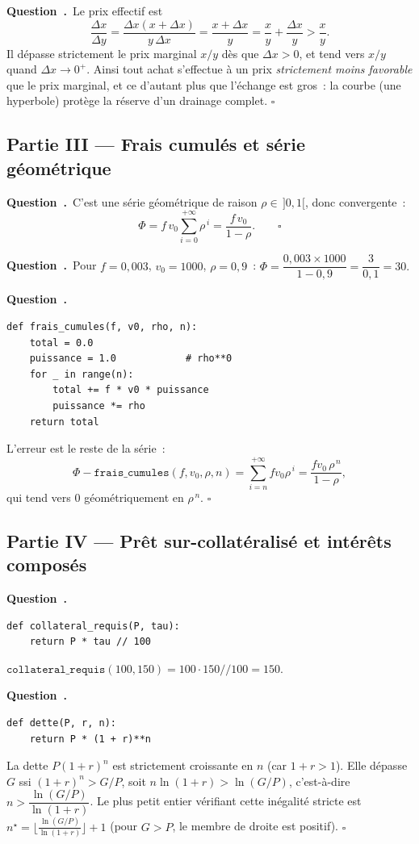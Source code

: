 \documentclass[11pt,a4paper]{article}
\newcounter{qcnt}
\newcommand{\Q}{\medskip\par\stepcounter{qcnt}\noindent\textbf{Question~\theqcnt.}~}
\begin{document}
\Q Le prix effectif est
$$\frac{\Delta x}{\Delta y} = \frac{\Delta x (x+\Delta x)}{y\,\Delta x}
= \frac{x+\Delta x}{y} = \frac{x}{y} + \frac{\Delta x}{y} > \frac{x}{y}.$$
Il dépasse strictement le prix marginal $x/y$ dès que $\Delta x > 0$, et tend vers $x/y$ quand
$\Delta x \to 0^{+}$. Ainsi tout achat s'effectue à un prix \emph{strictement moins favorable}
que le prix marginal, et ce d'autant plus que l'échange est gros~: la courbe (une hyperbole)
protège la réserve d'un drainage complet. $\square$

\subsection*{Partie III --- Frais cumulés et série géométrique}

\Q C'est une série géométrique de raison $\rho \in\, ]0,1[$, donc convergente~:
$$\Phi = f\,v_0 \sum_{i=0}^{+\infty} \rho^{\,i} = \frac{f\,v_0}{1-\rho}. \qquad \square$$

\Q Pour $f=0{,}003$, $v_0=1000$, $\rho=0{,}9$~:
$\Phi = \dfrac{0{,}003 \times 1000}{1 - 0{,}9} = \dfrac{3}{0{,}1} = 30.$

\Q
\begin{lstlisting}
def frais_cumules(f, v0, rho, n):
    total = 0.0
    puissance = 1.0            # rho**0
    for _ in range(n):
        total += f * v0 * puissance
        puissance *= rho
    return total
\end{lstlisting}
L'erreur est le reste de la série~:
$$\Phi - \mathtt{frais\_cumules}(f,v_0,\rho,n)
= \sum_{i=n}^{+\infty} f v_0 \rho^{\,i} = \frac{f v_0\,\rho^{\,n}}{1-\rho},$$
qui tend vers $0$ géométriquement en $\rho^{\,n}$. $\square$

\subsection*{Partie IV --- Prêt sur-collatéralisé et intérêts composés}

\Q
\begin{lstlisting}
def collateral_requis(P, tau):
    return P * tau // 100
\end{lstlisting}
$\mathtt{collateral\_requis}(100,150) = 100\cdot150 // 100 = 150$.

\Q
\begin{lstlisting}
def dette(P, r, n):
    return P * (1 + r)**n
\end{lstlisting}
La dette $P(1+r)^n$ est strictement croissante en $n$ (car $1+r>1$). Elle dépasse $G$ ssi
$(1+r)^n > G/P$, soit $n \ln(1+r) > \ln(G/P)$, c'est-à-dire $n > \dfrac{\ln(G/P)}{\ln(1+r)}$. Le
plus petit entier vérifiant cette inégalité stricte est
$n^{\star} = \bigl\lfloor \tfrac{\ln(G/P)}{\ln(1+r)} \bigr\rfloor + 1$ (pour $G > P$, le membre de
droite est positif). $\square$
\end{document}
